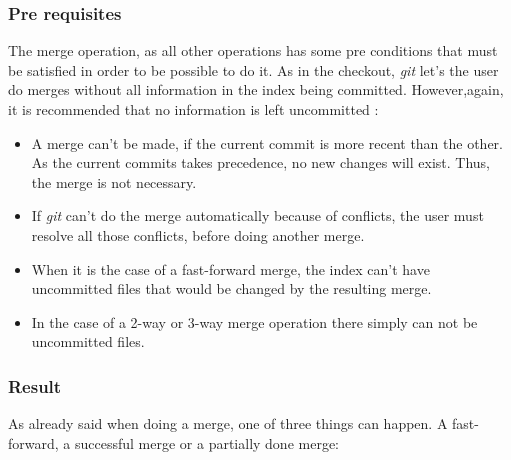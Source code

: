 \subsubsection{Pre requisites}
The merge operation, as all other operations has some pre conditions that
must be satisfied in order to be possible to do it. As in the checkout,
\emph{git} let's the user do merges without all information in the index 
being committed. However,again, it is recommended that no information is 
left uncommitted :

\begin{itemize}
\item A merge can't be made, if the current commit is more recent than the
other. As the current commits takes precedence, no new changes will exist. 
Thus, the merge is not necessary.
\item If \emph{git} can't do the merge automatically because of conflicts,
the user must resolve all those conflicts, before doing another merge.

\item When it is the case of a fast-forward merge, the index can't have 
uncommitted files that would be changed by the resulting merge.

\item In the case of a 2-way or 3-way merge operation there simply 
can not be uncommitted files.
\end{itemize}

\subsubsection{Result}
As already said when doing a merge, one of three things can happen. A 
fast-forward, a successful merge or a partially done merge:

